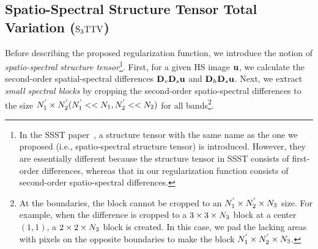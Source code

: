 \documentclass[10pt,journal]{IEEEtran}
\begin{document}
\subsection{Spatio-Spectral Structure Tensor Total Variation (${\text{S}_{3} \text{TTV}}$)}
\label{subsec:S3TTV}
Before describing the proposed regularization function, we introduce the notion of \textit{spatio-spectral structure tensor}\footnote{In the SSST paper~\cite{Kurihara2017SSST}, a structure tensor with the same name as the one we proposed (i.e., spatio-spectral structure tensor) is introduced. However, they are essentially different because the structure tensor in SSST consists of first-order differences, whereas that in our regularization function consists of second-order spatio-spectral differences.}.
First, for a given HS image $\mathbf{u}$, we calculate the second-order spatial-spectral differences $\mathbf{D}_{v} \mathbf{D}_{s} \mathbf{u}$ and $\mathbf{D}_{h} \mathbf{D}_{s} \mathbf{u}$.
Next, we extract \textit{small spectral blocks} by cropping the second-order spatio-spectral differences to the size $N_{1}^{'} \times N_{2}^{'} (N_{1}^{'} << N_{1}, N_{2}^{'} << N_{2})$ for all bands\footnote{At the boundaries, the block cannot be cropped to an $N_{1}^{'} \times N_{2}^{'} \times N_{3}$ size. For example, when the difference is cropped to a $3 \times 3 \times N_{3}$ block at a center $(1, 1)$, a $2 \times 2 \times N_{3}$ block is created. In this case, we pad the lacking areas with pixels on the opposite boundaries to make the block $N_{1}^{'} \times N_{2}^{'} \times N_{3}$.}.
\end{document}
